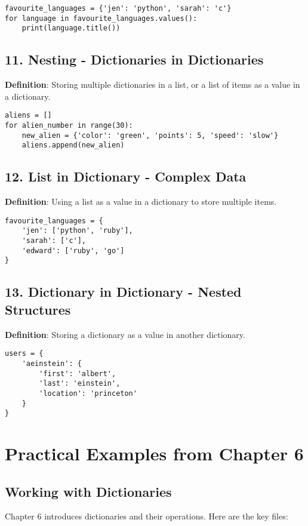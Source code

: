\begin{lstlisting}
favourite_languages = {'jen': 'python', 'sarah': 'c'}
for language in favourite_languages.values():
    print(language.title())
\end{lstlisting}

\subsection*{11. Nesting - Dictionaries in Dictionaries}
\textbf{Definition}: Storing multiple dictionaries in a list, or a list of items as a value in a dictionary.

\begin{lstlisting}
aliens = []
for alien_number in range(30):
    new_alien = {'color': 'green', 'points': 5, 'speed': 'slow'}
    aliens.append(new_alien)
\end{lstlisting}

\subsection*{12. List in Dictionary - Complex Data}
\textbf{Definition}: Using a list as a value in a dictionary to store multiple items.

\begin{lstlisting}
favourite_languages = {
    'jen': ['python', 'ruby'],
    'sarah': ['c'],
    'edward': ['ruby', 'go']
}
\end{lstlisting}

\subsection*{13. Dictionary in Dictionary - Nested Structures}
\textbf{Definition}: Storing a dictionary as a value in another dictionary.

\begin{lstlisting}
users = {
    'aeinstein': {
        'first': 'albert',
        'last': 'einstein',
        'location': 'princeton'
    }
}
\end{lstlisting}

\section*{Practical Examples from Chapter 6}

\subsection*{Working with Dictionaries}
Chapter 6 introduces dictionaries and their operations. Here are the key files:

